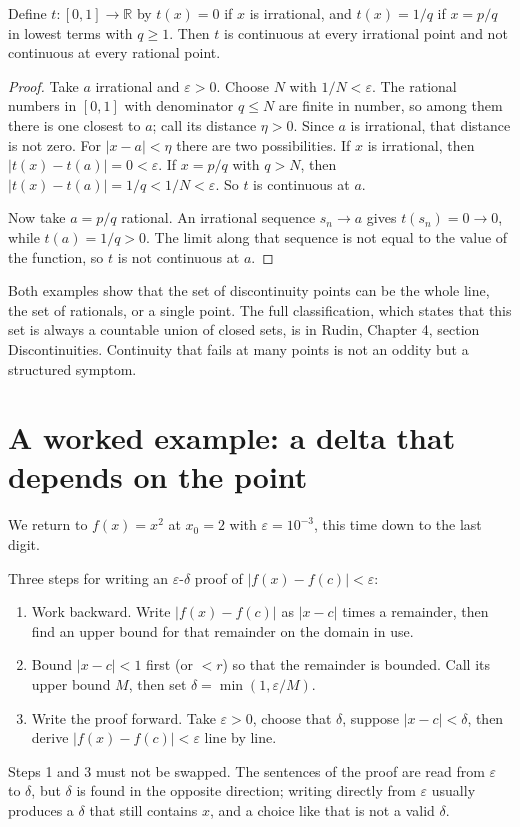 \begin{contoh}
Define $t\colon[0,1]\to\mathbb{R}$ by $t(x)=0$ if $x$ is irrational, and
$t(x)=1/q$ if $x=p/q$ in lowest terms with $q\ge 1$. Then $t$ is
continuous at every irrational point and not continuous at every rational point.
\end{contoh}

\begin{proof}
Take $a$ irrational and $\varepsilon>0$. Choose $N$ with $1/N<\varepsilon$. The rational
numbers in $[0,1]$ with denominator $q\le N$ are finite in number, so among them there is
one closest to $a$; call its distance $\eta>0$. Since $a$ is irrational, that distance is
not zero. For $|x-a|<\eta$ there are two possibilities. If $x$ is irrational, then
$|t(x)-t(a)|=0<\varepsilon$. If $x=p/q$ with $q>N$, then
$|t(x)-t(a)|=1/q<1/N<\varepsilon$. So $t$ is continuous at $a$.

Now take $a=p/q$ rational. An irrational sequence $s_{n}\to a$ gives
$t(s_{n})=0\to 0$, while $t(a)=1/q>0$. The limit along that sequence is not equal to the
value of the function, so $t$ is not continuous at $a$.
\end{proof}

Both examples show that the set of discontinuity points can be the whole line, the set of
rationals, or a single point. The full classification, which states that this set is
always a countable union of closed sets, is in Rudin, Chapter 4, section
Discontinuities. Continuity that fails at many points is not an oddity but a structured
symptom.

\section{A worked example: a delta that depends on the point}

We return to $f(x)=x^{2}$ at $x_{0}=2$ with $\varepsilon=10^{-3}$, this time
down to the last digit.

\begin{resep}
Three steps for writing an $\varepsilon$-$\delta$ proof of $|f(x)-f(c)|<\varepsilon$:
\begin{enumerate}
  \item Work backward. Write $|f(x)-f(c)|$ as $|x-c|$ times a remainder, then find an
        upper bound for that remainder on the domain in use.
  \item Bound $|x-c|<1$ first (or $<r$) so that the remainder is bounded. Call
        its upper bound $M$, then set $\delta=\min(1,\varepsilon/M)$.
  \item Write the proof forward. Take $\varepsilon>0$, choose that $\delta$, suppose
        $|x-c|<\delta$, then derive $|f(x)-f(c)|<\varepsilon$ line by line.
\end{enumerate}
Steps 1 and 3 must not be swapped. The sentences of the proof are read from $\varepsilon$
to $\delta$, but $\delta$ is found in the opposite direction; writing directly from
$\varepsilon$ usually produces a $\delta$ that still contains $x$, and a choice like
that is not a valid $\delta$.
\end{resep}

